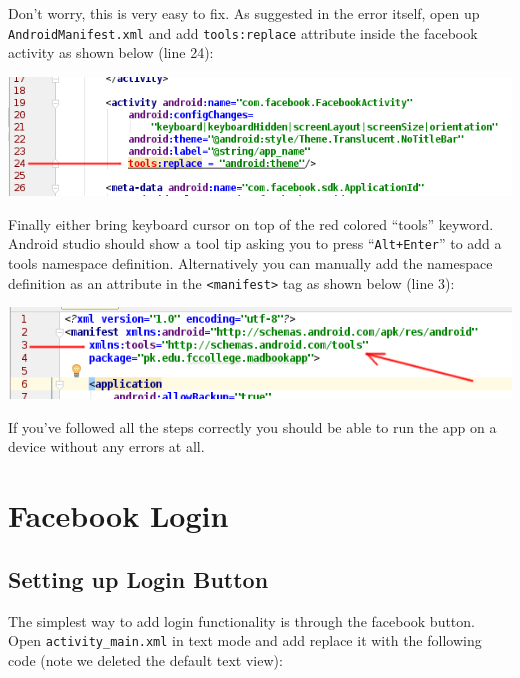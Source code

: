 Don't worry, this is very easy to fix. As suggested in the error itself, open up \texttt{AndroidManifest.xml} and add \texttt{tools:replace} attribute inside the facebook activity as shown below (line 24):

\begin{center}
	\includegraphics[scale=\SourceCodeScale]{chapters/ch12/images/18}
\end{center}

Finally either bring keyboard cursor on top of the red colored ``tools'' keyword. Android studio should show a tool tip asking you to press ``\texttt{Alt+Enter}'' to add a tools namespace definition. Alternatively you can manually add the namespace definition as an attribute in the \texttt{<manifest>} tag as shown below (line 3):

\begin{center}
	\includegraphics[scale=\SourceCodeScale]{chapters/ch12/images/19}
\end{center}

If you've followed all the steps correctly you should be able to run the app on a device without any errors at all.

\section{Facebook Login}

\subsection{Setting up Login Button}
The simplest way to add login functionality is through the facebook button. Open \texttt{activity\_main.xml} in text mode and add replace it with the following code (note we deleted the default text view):

